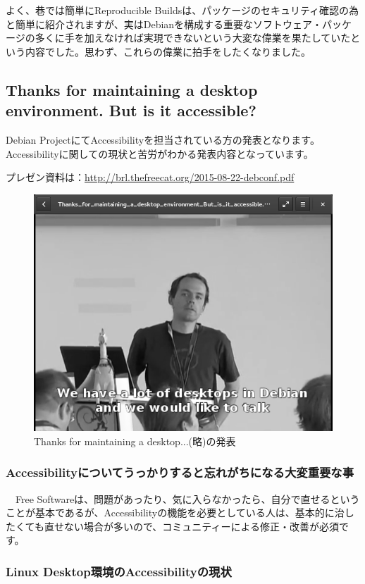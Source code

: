 \documentclass[mingoth,a4paper]{jsarticle}
\begin{document}
よく、巷では簡単にReproducible Buildsは、パッケージのセキュリティ確認の為と簡単に紹介されますが、実はDebianを構成する重要なソフトウェア・パッケージの多くに手を加えなければ実現できないという大変な偉業を果たしていたという内容でした。思わず、これらの偉業に拍手をしたくなりました。

\subsection{Thanks for maintaining a desktop environment. But is it accessible?}

 Debian ProjectにてAccessibilityを担当されている方の発表となります。
Accessibilityに関しての現状と苦労がわかる発表内容となっています。

 プレゼン資料は：\url{http://brl.thefreecat.org/2015-08-22-debconf.pdf}

\begin{figure}[H]
\begin{center}
\includegraphics[width=0.5\hsize]{image201510/accessibility_mono.png}
\end{center}
\caption{Thanks for maintaining a desktop...(略)の発表}
\end{figure}

\subsubsection{Accessibilityについてうっかりすると忘れがちになる大変重要な事}

　Free Softwareは、問題があったり、気に入らなかったら、自分で直せるということが基本であるが、Accessibilityの機能を必要としている人は、基本的に治したくても直せない場合が多いので、コミュニティーによる修正・改善が必須です。

\subsubsection{Linux Desktop環境のAccessibilityの現状}
\end{document}
